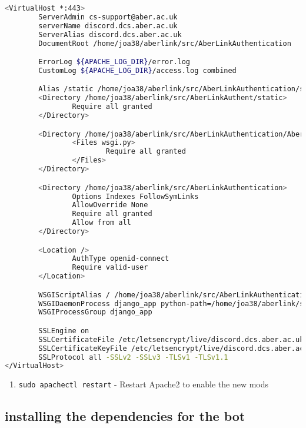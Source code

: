 \begin{lstlisting}[language=bash]
<VirtualHost *:443>
        ServerAdmin cs-support@aber.ac.uk
        serverName discord.dcs.aber.ac.uk
        ServerAlias discord.dcs.aber.ac.uk
        DocumentRoot /home/joa38/aberlink/src/AberLinkAuthentication

        ErrorLog ${APACHE_LOG_DIR}/error.log
        CustomLog ${APACHE_LOG_DIR}/access.log combined

        Alias /static /home/joa38/aberlink/src/AberLinkAuthentication/static
        <Directory /home/joa38/aberlink/src/AberLinkAuthent/static>
                Require all granted
        </Directory>

        <Directory /home/joa38/aberlink/src/AberLinkAuthentication/AberLinkAuthentication>
                <Files wsgi.py>
                        Require all granted
                </Files>
        </Directory>

        <Directory /home/joa38/aberlink/src/AberLinkAuthentication>
                Options Indexes FollowSymLinks
                AllowOverride None
                Require all granted
                Allow from all
        </Directory>

        <Location />
                AuthType openid-connect
                Require valid-user
        </Location>

        WSGIScriptAlias / /home/joa38/aberlink/src/AberLinkAuthentication/AberLinkAuthentication/wsgi.py
        WSGIDaemonProcess django_app python-path=/home/joa38/aberlink/src/AberLinkAuthentication python-home=/home/joa38/aberlink/src/AberLinkAuthentication/venv
        WSGIProcessGroup django_app

        SSLEngine on
        SSLCertificateFile /etc/letsencrypt/live/discord.dcs.aber.ac.uk/fullchain.pem
        SSLCertificateKeyFile /etc/letsencrypt/live/discord.dcs.aber.ac.uk/privkey.pem
        SSLProtocol all -SSLv2 -SSLv3 -TLSv1 -TLSv1.1
</VirtualHost>
\end{lstlisting}

\begin{enumerate}
\def\labelenumi{\arabic{enumi}.}
\setcounter{enumi}{6}
\itemsep1pt\parskip0pt
\item
  \texttt{sudo apachectl restart} - Restart Apache2 to enable the new
  mods
\end{enumerate}

\subsection{installing the dependencies for the
bot}\label{installing-the-dependencies-for-the-bot}

